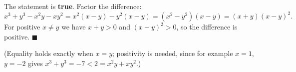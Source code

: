 The statement is \textbf{true}. Factor the difference:
\[x^3+y^3-x^2y-xy^2=x^2(x-y)-y^2(x-y)=\left(x^2-y^2\right)(x-y)=(x+y)(x-y)^2 .\]
For positive $x\ne y$ we have $x+y>0$ and $(x-y)^2>0$, so the difference is positive. $\blacksquare$

(Equality holds exactly when $x=y$; positivity is needed, since for example $x=1$, $y=-2$ gives $x^3+y^3=-7<2=x^2y+xy^2$.)
